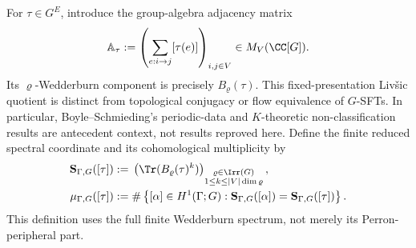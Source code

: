 For \(\tau\in G^E\), introduce the group-algebra adjacency matrix
\begin{equation}\label{eq:group-algebra-adjacency-inverse}
  \mathbb A_\tau
  :=\left(\sum_{e:i\to j}[\tau(e)]\right)_{i,j\in V}
  \in M_V(\CC[G]).
\end{equation}
Its \(\varrho\)-Wedderburn component is precisely \(B_\varrho(\tau)\).
This fixed-presentation Liv\v{s}ic quotient is distinct from topological
conjugacy or flow equivalence of \(G\)-SFTs.  In particular,
Boyle--Schmieding's periodic-data and \(K\)-theoretic non-classification
results \cite{BoyleSchmieding2017FiniteGroupExtensions} are antecedent
context, not results reproved here.
Define the finite reduced spectral coordinate and its cohomological
multiplicity by
\begin{align}
  \mathbf S_{\Gamma,G}([\tau])
  &:={}
    \left(
      \Tr(B_\varrho(\tau)^k)
    \right)_{\substack{\varrho\in\Irr(G)\\
                 1\leq k\leq |V|\dim\varrho}},
    \label{eq:wedderburn-spectral-coordinate}\\
  \mu_{\Gamma,G}([\tau])
  &:={}
    \#\left\{[\alpha]\in H^1(\Gamma;G):
      \mathbf S_{\Gamma,G}([\alpha])
      =\mathbf S_{\Gamma,G}([\tau])\right\}.
    \label{eq:spectral-cohomology-multiplicity}
\end{align}
This definition uses the full finite Wedderburn spectrum, not merely its
Perron-peripheral part.

